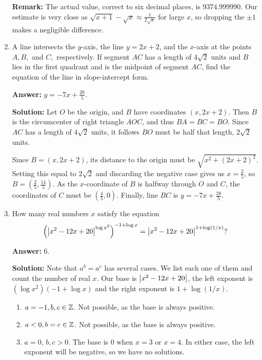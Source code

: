 \documentclass[11pt,paper=letter]{scrartcl}
\begin{document}
\begin{enumerate}[left=0pt]
\textbf{Remark:} The actual value, correct to six decimal places, is $9374.999990$. Our estimate is very close as $\sqrt{x + 1} - \sqrt{x} \approx \frac{1}{2\sqrt{x}}$ for large $x$, so dropping the $\pm 1$ makes a negligible difference.

\item A line intersects the $y$-axis, the line $y = 2x + 2$, and the $x$-axis at the points $A, B,$ and $C,$ respectively. If segment $AC$ has a length of $4\sqrt{2}$ units and $B$ lies in the first quadrant and is the midpoint of segment $AC$, find the equation of the line in slope-intercept form.

\textbf{Answer:} $\boxed{y = -7x + \frac{28}{5}}$.

\textbf{Solution:} Let $O$ be the origin, and $B$ have coordinates $(x, 2x+2)$. Then $B$ is the circumcenter of right triangle $AOC$, and thus $BA = BC = BO$. Since $AC$ has a length of $4\sqrt{2}$ units, it follows $BO$ must be half that length, $2\sqrt{2}$ units.

Since $B = (x, 2x+2)$, its distance to the origin must be $\sqrt{x^2 + (2x + 2)^2}$. Setting this equal to $2\sqrt{2}$ and discarding the negative case gives us $x = \frac{2}{5}$, so $B = (\frac{2}{5}, \frac{14}{5})$. As the $x$-coordinate of $B$ is halfway through $O$ and $C$, the coordinates of $C$ must be $(\frac{4}{5}, 0)$. Finally, line $BC$ is $y = -7x + \frac{28}{5}$.

\item How many real numbers $x$ satisfy the equation $$\left( \left\lvert x^2 - 12x + 20 \right\rvert^{\log x^2} \right)^{-1 + \log x} = \left\lvert x^2 - 12x + 20 \right\rvert^{1 + \log(1/x)}?$$

\textbf{Answer:} $\boxed{6}$.

\textbf{Solution:} Note that $a^b = a^c$ has several cases. We list each one of them and count the number of real $x$. Our base is $\left\lvert x^2 - 12x + 20 \right\rvert$, the left exponent is $(\log x^2)(-1 + \log x)$ and the right exponent is $1 + \log(1/x)$.

\begin{enumerate}

\item $a = -1, b, c \in \mathbb Z$. Not possible, as the base is always positive.

\item $a < 0, b = c \in \mathbb Z$. Not possible, as the base is always positive.

\item $a = 0$, $b, c > 0$. The base is $0$ when $x = 3$ or $x = 4$. In either case, the left exponent will be negative, so we have no solutions.


\end{enumerate}
\end{enumerate}
\end{document}
